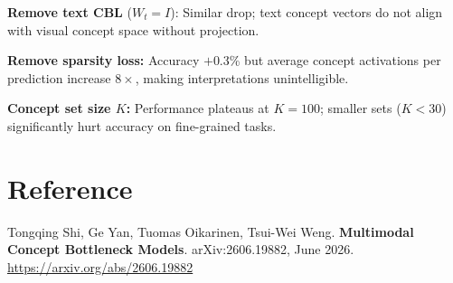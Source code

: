 \documentclass[10pt,twocolumn]{article}
\begin{document}
\textbf{Remove text CBL} ($W_t = I$): Similar drop; text concept vectors
do not align with visual concept space without projection.

\textbf{Remove sparsity loss:} Accuracy $+0.3$\% but average concept
activations per prediction increase $8\times$, making interpretations
unintelligible.

\textbf{Concept set size $K$:} Performance plateaus at $K=100$;
smaller sets ($K<30$) significantly hurt accuracy on fine-grained tasks.

\section*{Reference}

Tongqing Shi, Ge Yan, Tuomas Oikarinen, Tsui-Wei Weng.
\textbf{Multimodal Concept Bottleneck Models}.
arXiv:2606.19882, June 2026.
\url{https://arxiv.org/abs/2606.19882}
\end{document}
